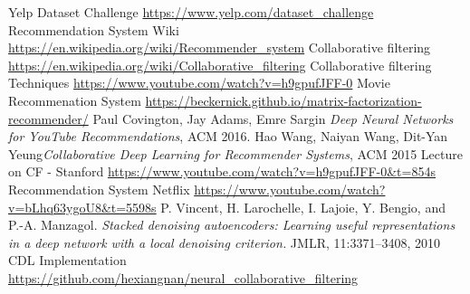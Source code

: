 \documentclass[11pt]{article}
\begin{document}
	\begin{thebibliography}{99}
		
	 Yelp Dataset Challenge \url{https://www.yelp.com/dataset_challenge}
	 Recommendation System Wiki \url{https://en.wikipedia.org/wiki/Recommender_system}
	Collaborative filtering \url{https://en.wikipedia.org/wiki/Collaborative_filtering}
		Collaborative filtering Techniques \url{https://www.youtube.com/watch?v=h9gpufJFF-0}
		Movie Recommenation System \url{https://beckernick.github.io/matrix-factorization-recommender/}
	 Paul Covington, Jay Adams, Emre Sargin \textit{Deep Neural Networks for YouTube Recommendations}, ACM 2016.
	 Hao Wang, Naiyan Wang, Dit-Yan Yeung\textit{Collaborative Deep Learning for Recommender Systems}, ACM 2015
	 Lecture on CF - Stanford \url{https://www.youtube.com/watch?v=h9gpufJFF-0&t=854s}
	 Recommendation System Netflix \url{https://www.youtube.com/watch?v=bLhq63ygoU8&t=5598s}
	 P. Vincent, H. Larochelle, I. Lajoie, Y. Bengio, and
	P.-A. Manzagol. \textit{Stacked denoising autoencoders:
		Learning useful representations in a deep network with
		a local denoising criterion.} JMLR, 11:3371–3408, 2010
	 CDL Implementation \url{https://github.com/hexiangnan/neural_collaborative_filtering}
	\end{thebibliography}
	
	
	
	
	
	
\end{document}
